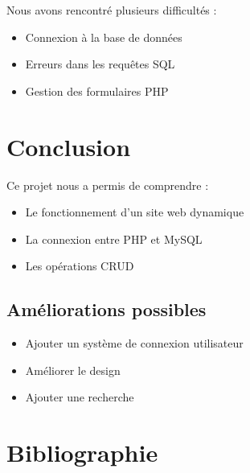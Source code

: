 \documentclass[a4paper,12pt]{article}
\begin{document}
Nous avons rencontré plusieurs difficultés :
\begin{itemize}
    \item Connexion à la base de données
    \item Erreurs dans les requêtes SQL
    \item Gestion des formulaires PHP
\end{itemize}

\section{Conclusion}

Ce projet nous a permis de comprendre :
\begin{itemize}
    \item Le fonctionnement d’un site web dynamique
    \item La connexion entre PHP et MySQL
    \item Les opérations CRUD
\end{itemize}

\subsection{Améliorations possibles}

\begin{itemize}
    \item Ajouter un système de connexion utilisateur
    \item Améliorer le design
    \item Ajouter une recherche
\end{itemize}
\section{Bibliographie }
\end{document}
